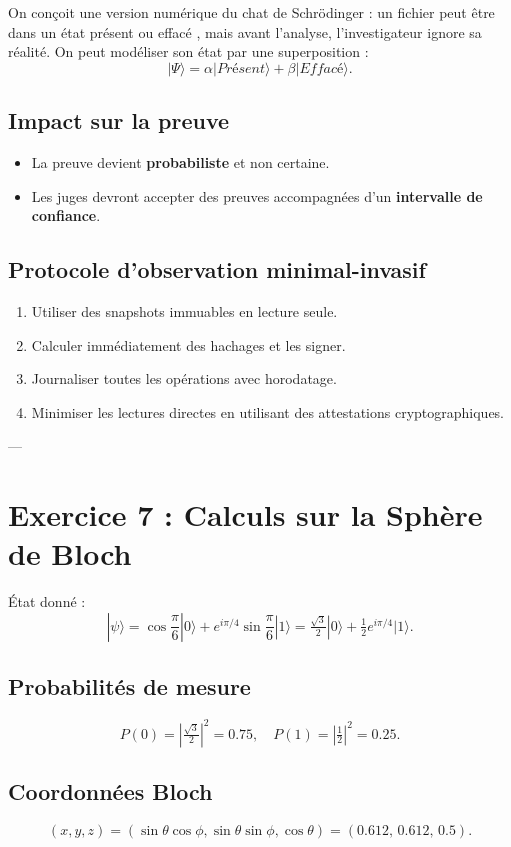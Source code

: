 \documentclass[memoire, 12pt]{report}
\begin{document}
\begin{titlepage}
On conçoit une version numérique du chat de Schrödinger : un fichier peut être dans un état \og présent \fg{} ou \og effacé \fg{}, mais avant l’analyse, l’investigateur ignore sa réalité.  
On peut modéliser son état par une superposition :
\[
|\Psi\rangle = \alpha |Présent\rangle + \beta |Effacé\rangle.
\]

\subsection*{Impact sur la preuve}
\begin{itemize}
  \item La preuve devient \textbf{probabiliste} et non certaine.
  \item Les juges devront accepter des preuves accompagnées d’un \textbf{intervalle de confiance}.
\end{itemize}

\subsection*{Protocole d’observation minimal-invasif}
\begin{enumerate}
  \item Utiliser des snapshots immuables en lecture seule.
  \item Calculer immédiatement des hachages et les signer.
  \item Journaliser toutes les opérations avec horodatage.
  \item Minimiser les lectures directes en utilisant des attestations cryptographiques.
\end{enumerate}

---

\section*{Exercice 7 : Calculs sur la Sphère de Bloch}

État donné :
\[
|\psi\rangle = \cos\frac{\pi}{6}|0\rangle + e^{i\pi/4}\sin\frac{\pi}{6}|1\rangle
= \tfrac{\sqrt{3}}{2}|0\rangle + \tfrac{1}{2} e^{i\pi/4}|1\rangle.
\]

\subsection*{Probabilités de mesure}
\[
P(0) = \left|\tfrac{\sqrt{3}}{2}\right|^2 = 0.75,
\quad
P(1) = \left|\tfrac{1}{2}\right|^2 = 0.25.
\]

\subsection*{Coordonnées Bloch}
\[
(x,y,z) = (\sin\theta \cos\phi, \sin\theta \sin\phi, \cos\theta) 
= (0.612,\,0.612,\,0.5).
\]


\end{titlepage}
\end{document}
